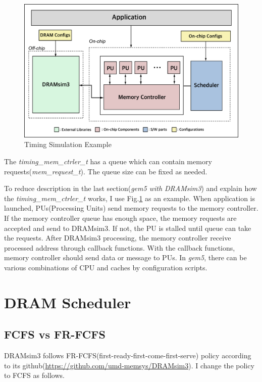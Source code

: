 \documentclass[conference]{IEEEtran}
\begin{document}


\begin{figure}
    \centering
    \includegraphics[width=1.00\linewidth]{image/example.pdf}
    \caption{Timing Simulation Example}
    \label{fig:tse}
\end{figure}

The \emph{timing\_mem\_ctrler\_t} has a queue which can contain memory requests(\emph{mem\_request\_t}).
The queue size can be fixed as needed.

To reduce description in the last section(\emph{gem5 with DRAMsim3}) and explain how the \emph{timing\_mem\_ctrler\_t} works, I use Fig.\ref{fig:tse} as an example.
When application is launched, PUs(Processing Units) send memory requests to the memory controller. 
If the memory controller queue has enough space, the memory requests are accepted and send to DRAMsim3. 
If not, the PU is stalled until queue can take the requests.
After DRAMsim3 processing, the memory controller receive processed address through callback functions.     
With the callback functions, memory controller should send data or message to PUs.
In \emph{gem5}, there can be various combinations of CPU and caches by configuration scripts. 

\section{DRAM Scheduler} \label{sec:dram_scheduler}
\subsection{FCFS vs FR-FCFS}
DRAMsim3 follows FR-FCFS(first-ready-first-come-first-serve) policy according to its github(\url{https://github.com/umd-memsys/DRAMsim3}). 
I change the policy to FCFS as follows.
\end{document}
